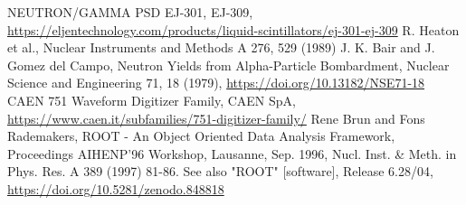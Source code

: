 \documentclass[a4paper,12pt]{report}
\begin{document}
\begin{thebibliography}{5}
	NEUTRON/GAMMA PSD EJ-301, EJ-309, \url{https://eljentechnology.com/products/liquid-scintillators/ej-301-ej-309}
	R. Heaton et al., Nuclear Instruments and Methods A 276, 529 (1989)
	J. K. Bair and J. Gomez del Campo, Neutron Yields from Alpha-Particle Bombardment, Nuclear Science and Engineering 71, 18 (1979), \url{https://doi.org/10.13182/NSE71-18}
	CAEN 751 Waveform Digitizer Family, CAEN SpA, \url{https://www.caen.it/subfamilies/751-digitizer-family/}
	Rene Brun and Fons Rademakers, ROOT - An Object Oriented Data Analysis Framework, Proceedings AIHENP'96 Workshop, Lausanne, Sep. 1996, Nucl. Inst. \& Meth. in Phys. Res. A 389 (1997) 81-86. See also "ROOT" [software], Release 6.28/04, \url{https://doi.org/10.5281/zenodo.848818}
\end{thebibliography}
\end{document}
